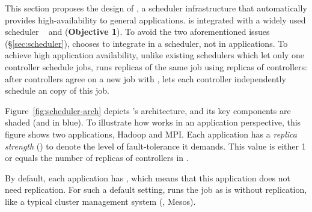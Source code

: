This section proposes the design of \tripod, a scheduler infrastructure that 
automatically provides high-availability to general applications. \tripod 
is integrated with a widely used scheduler \mesos~\cite{mesos:nsdi11} and 
\falcon (\textbf{Objective 1}). To avoid the two aforementioned issues 
(\S\ref{sec:scheduler}), \tripod chooses 
to integrate \paxos in a scheduler, not in applications. To achieve high
application availability, unlike existing schedulers which let only one 
controller schedule jobs, \tripod runs replicas of the same job using replicas 
of controllers: after controllers agree on a new job with \falcon, \tripod lets 
each controller independently schedule an copy of this job.







Figure~\ref{fig:scheduler-arch} depicts \tripod's architecture, and its key 
components are shaded (and in blue). To illustrate how \tripod works in an 
application perspective, this figure shows two applications, Hadoop and MPI. 
Each application has a \emph{replica strength} () to denote the level of 
fault-tolerance it demands. This value is either 1 or equals the number of 
replicas of controllers in \tripod.

By default, each application has , which means that this application 
does not need replication. For such a default setting, \tripod runs the job as 
is without replication, like a typical cluster management system (\eg, Mesos).

